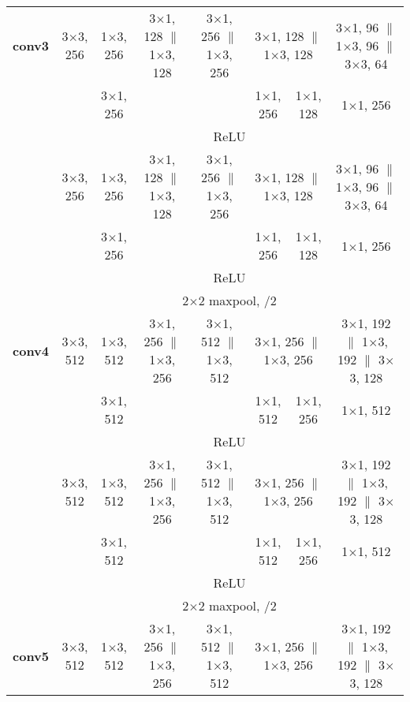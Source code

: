 \documentclass[thesis]{subfiles}
\begin{document}
{\begin{landscape}
{\begin{table*}[p]
\begin{tabular}{@{}|c||c|c|c|c|c|c|c|c|@{}}
	\textbf{conv3} & \multicolumn{2}{c|}{3$\times$3, 256} & 1$\times$3, 256 & 3$\times$1, 128 $\|$ 1$\times$3, 128 & 3$\times$1, 256 $\|$ 1$\times$3, 256 & \multicolumn{2}{c|}{3$\times$1, 128 $\|$ 1$\times$3, 128} & 3$\times$1, 96 $\|$ 1$\times$3, 96 $\|$ 3$\times$3, 64 \\
	\cline{4-4} \cline{7-9}
    & \multicolumn{2}{c|}{} & 3$\times$1, 256 & & & 1$\times$1, 256 & 1$\times$1, 128 & 1$\times$1, 256\\
    \cline{2-9}
	& \multicolumn{8}{c|}{ReLU}\\
    \cline{2-9}
	& \multicolumn{2}{c|}{3$\times$3, 256} & 1$\times$3, 256 & 3$\times$1, 128 $\|$ 1$\times$3, 128 & 3$\times$1, 256 $\|$ 1$\times$3, 256 &\multicolumn{2}{c|}{3$\times$1, 128 $\|$ 1$\times$3, 128} & 3$\times$1, 96 $\|$ 1$\times$3, 96 $\|$ 3$\times$3, 64 \\
	\cline{4-4} \cline{7-9}	
	& \multicolumn{2}{c|}{} & 3$\times$1, 256 & & & 1$\times$1, 256 & 1$\times$1, 128 & 1$\times$1, 256\\
    \cline{2-9}
	& \multicolumn{8}{c|}{ReLU}\\
    \cline{2-9}
	& \multicolumn{8}{c|}{2$\times$2 maxpool, /2}\\
	\hline
	\textbf{conv4} & \multicolumn{2}{c|}{3$\times$3, 512} & 1$\times$3, 512 & 3$\times$1, 256 $\|$ 1$\times$3, 256 & 3$\times$1, 512 $\|$ 1$\times$3, 512 &\multicolumn{2}{c|}{3$\times$1, 256 $\|$ 1$\times$3, 256} & 3$\times$1, 192 $\|$ 1$\times$3, 192 $\|$ 3$\times$3, 128\\
	\cline{4-4} \cline{7-9}
	& \multicolumn{2}{c|}{} & 3$\times$1, 512 & & & 1$\times$1, 512 & 1$\times$1, 256 & 1$\times$1, 512\\
    \cline{2-9}
	& \multicolumn{8}{c|}{ReLU}\\
    \cline{2-9}
	& \multicolumn{2}{c|}{3$\times$3, 512} & 1$\times$3, 512 & 3$\times$1, 256 $\|$ 1$\times$3, 256 & 3$\times$1, 512 $\|$ 1$\times$3, 512 & \multicolumn{2}{c|}{3$\times$1, 256 $\|$ 1$\times$3, 256} & 3$\times$1, 192 $\|$ 1$\times$3, 192 $\|$ 3$\times$3, 128\\
	\cline{4-4} \cline{7-9}
	& \multicolumn{2}{c|}{} & 3$\times$1, 512 & & & 1$\times$1, 512 & 1$\times$1, 256 & 1$\times$1, 512\\
    \cline{2-9}
	& \multicolumn{8}{c|}{ReLU}\\
    \cline{2-9}
	& \multicolumn{8}{c|}{2$\times$2 maxpool, /2}\\
	\hline
    \textbf{conv5} & \multicolumn{2}{c|}{3$\times$3, 512} & 1$\times$3, 512 & 3$\times$1, 256 $\|$ 1$\times$3, 256 & 3$\times$1, 512 $\|$ 1$\times$3, 512 & \multicolumn{2}{c|}{3$\times$1, 256 $\|$ 1$\times$3, 256} & 3$\times$1, 192 $\|$ 1$\times$3, 192 $\|$ 3$\times$3, 128\\

\end{tabular}
\end{table*}}
\end{landscape}}
\end{document}
